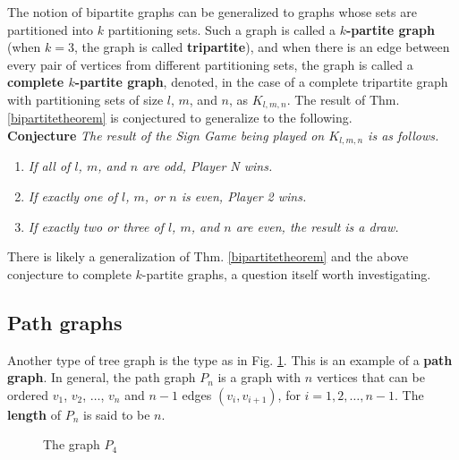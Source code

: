 \documentclass[amsart,11pt]{article}
\theoremstyle{dotless}
\theoremstyle{dotless}
\begin{document}
The notion of bipartite graphs can be generalized to graphs whose sets are partitioned into $k$ partitioning sets. Such a graph is called a \textbf{$k$-partite graph} (when $k=3$, the graph is called \textbf{tripartite}), and when there is an edge between every pair of vertices from different partitioning sets, the graph is called a \textbf{complete $k$-partite graph}, denoted, in the case of a complete tripartite graph with partitioning sets of size $l$, $m$, and $n$, as $K_{l,m,n}$. The result of Thm. \ref{bipartitetheorem} is conjectured to generalize to the following.\\

\noindent \textbf{Conjecture} \textit{The result of the Sign Game being played on $K_{l,m,n}$ is as follows.}

\begin{enumerate}
    \item \textit{If all of $l$, $m$, and $n$ are odd, Player N wins.}
    \item \textit{If exactly one of $l$, $m$, or $n$ is even, Player 2 wins.}
    \item \textit{If exactly two or three of $l$, $m$, and $n$ are even, the result is a draw.}
\end{enumerate}

There is likely a generalization of Thm. \ref{bipartitetheorem} and the above conjecture to complete $k$-partite graphs, a question itself worth investigating.

\subsection{Path graphs}

Another type of tree graph is the type as in Fig. \ref{figpath1}. This is an example of a \textbf{path graph}. In general, the path graph $P_n$ is a graph with $n$ vertices that can be ordered $v_1$, $v_2$, $\ldots$, $v_n$ and $n-1$ edges $\left(v_i,v_{i+1}\right)$, for $i = 1,2,\ldots,n-1$. The \textbf{length} of $P_n$ is said to be $n$.

\begin{figure}[htb] 
\centering
{}
\caption{The graph $P_4$}
\label{figpath1}
\end{figure}
\end{document}
